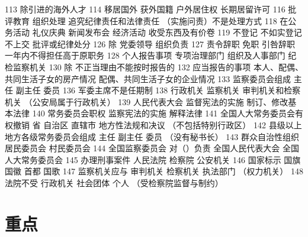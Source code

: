 \documentclass[cyan]{elegantnote}
\begin{document}
113 除引进的海外人才
114 移居国外
获外国籍 户外居住权 长期居留许可
116 批评教育 组织处理 追究纪律责任和法律责任
（实施问责）不是处理方式
118 在公务活动
礼仪庆典 新闻发布会 经济活动 收受东西及有价卷
119 不登记 不如实登记 不上交 批评或纪律处分
126 除 党委领导 组织负责
127 责令辞职 免职 引咎辞职 一年内不得担任高于原职务
128 个人报告事项 专项治理部门
组织及人事部门 纪检监察机关
130 除 不正当理由不能按时报告的
132 应当报告的事项
本人、配偶、共同生活子女的房产情况
配偶、共同生活子女的企业情况
133 监察委员会组成
主任 副主任 委员
136 军委主席不是任期制
138 行政机关 监察机关 审判机关和检察机关
（公安局属于行政机关）
139 人民代表大会
监督宪法的实施
制订、修改基本法律
140 常务委员会职权
监察宪法的实施
解释法律
141 全国人大常务委员会有权撤销
省 自治区 直辖市 地方性法规和决议
（不包括特别行政区）
142 县级以上地方各级常务委员会组成
主任
副主任
委员
（没有秘书长）
143 群众自治性组织
居民委员会
村民委员会
144 全国监察委员会 对（）负责
全国人民代表大会
全国人大常务委员会
145 办理刑事案件
人民法院 检察院 公安机关
146 国家标示
国旗 国徽 首都 国歌
147 监察机关应与
审判机关
检察机关
执法部门
（权力机关）
148 法院不受
行政机关
社会团体
个人
（受检察院监督与制约）
\section{重点}
\label{sec:orgf8a04da}
\end{document}
